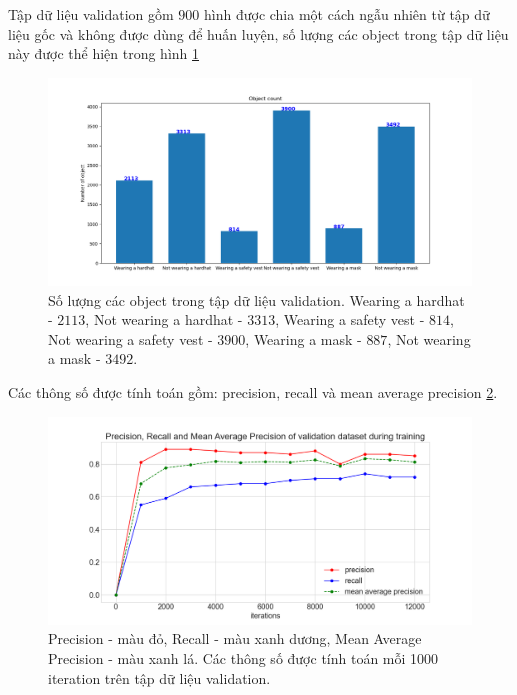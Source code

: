 Tập dữ liệu validation gồm $900$ hình được chia một cách ngẫu nhiên từ tập dữ liệu gốc và không được dùng để huấn luyện, số lượng các object trong tập dữ liệu này được thể hiện trong hình \ref{fig:validation_set}
\begin{figure}[ht!]
	\centerline{\includegraphics[scale=0.5]{images/validation_set.png}}
  	\caption{Số lượng các object trong tập dữ liệu validation. Wearing a hardhat - $2113$, Not wearing a hardhat - $3313$, Wearing a safety vest - $814$, Not wearing a safety vest - $3900$, Wearing a mask - $887$, Not wearing a mask - $3492$.}
  	\label{fig:validation_set}
\end{figure}

Các thông số được tính toán gồm: precision, recall và mean average precision \ref{fig:precision_recall_map}.
\begin{figure}[ht!]
	\centerline{\includegraphics[scale=0.6]{images/precision_recall_map.png}}
  	\caption{Precision - màu đỏ, Recall - màu xanh dương, Mean Average Precision - màu xanh lá. Các thông số được tính toán mỗi 1000 iteration trên tập dữ liệu validation.}
  	\label{fig:precision_recall_map}
\end{figure}

